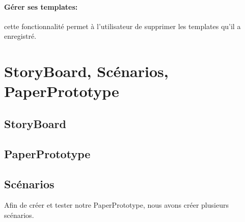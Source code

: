 \documentclass[a4paper,10pt]{article}
\begin{document}
\paragraph{Gérer ses templates:} cette fonctionnalité permet à l'utilisateur de supprimer les templates qu'il a enregistré.

\newpage
\section{StoryBoard, Scénarios, PaperPrototype}

\subsection{StoryBoard}

\subsection{PaperPrototype}

\subsection{Scénarios}
Afin de créer et tester notre PaperPrototype, nous avons créer plusieurs scénarios.
\end{document}
